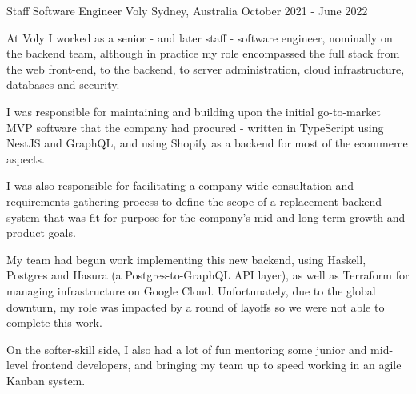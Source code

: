 \begin{cventries}
\cventry
{Staff Software Engineer} %
{Voly} %
{Sydney, Australia} %
{October 2021 - June 2022} %
{ %
\begin{cvitems}
  \item {At Voly I worked as a senior - and later staff - software engineer, nominally on the backend team, although in practice my role encompassed the full stack from the web front-end, to the backend, to server administration, cloud infrastructure, databases and security.}
  \item {I was responsible for maintaining and building upon the initial go-to-market MVP software that the company had procured - written in TypeScript using NestJS and GraphQL, and using Shopify as a backend for most of the ecommerce aspects.}
  \item {I was also responsible for facilitating a company wide consultation and requirements gathering process to define the scope of a replacement backend system that was fit for purpose for the company's mid and long term growth and product goals.}
  \item {My team had begun work implementing this new backend, using Haskell, Postgres and Hasura (a Postgres-to-GraphQL API layer), as well as Terraform for managing infrastructure on Google Cloud. Unfortunately, due to the global downturn, my role was impacted by a round of layoffs so we were not able to complete this work.}
  \item {On the softer-skill side, I also had a lot of fun mentoring some junior and mid-level frontend developers, and bringing my team up to speed working in an agile Kanban system.}
\end{cvitems}
\vspace{2.0mm}
}



\end{cventries}

